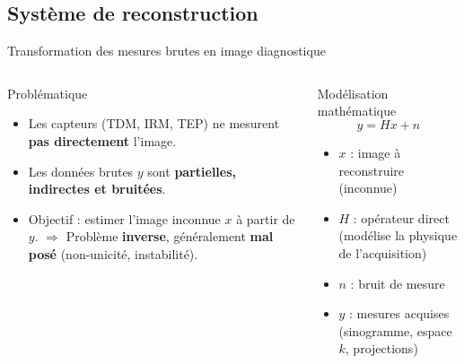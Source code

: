 \subsection{Système de reconstruction}
\begin{frame}{Transformation des mesures brutes en image diagnostique}
    \begin{columns}
    \begin{block}{Problématique}
        \begin{itemize}
            \item Les capteurs (TDM, IRM, TEP) ne mesurent \textbf{pas directement} l'image.
            \item Les données brutes $y$ sont \textbf{partielles, indirectes et bruitées}.
            \item Objectif : estimer l'image inconnue $x$ à partir de $y$.
            $\Rightarrow$ Problème \textbf{inverse}, généralement \textbf{mal posé} (non-unicité, instabilité).
        \end{itemize}
    \end{block}

    \begin{block}{Modélisation mathématique}
        \begin{equation}
            y = Hx + n
        \end{equation}
        \begin{itemize}
            \item $x$ : image à reconstruire (inconnue)
            \item $H$ : opérateur direct (modélise la physique de l'acquisition)
            \item $n$ : bruit de mesure
            \item $y$ : mesures acquises (sinogramme, espace $k$, projections)
        \end{itemize}
    \end{block}
\end{columns}
\end{frame}

